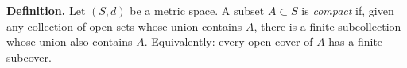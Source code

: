 \textbf{Definition.} Let $(S, d)$ be a metric space. A subset $A \subset S$ is \textit{compact} if, given any collection of open sets whose union contains $A$, there is a finite subcollection whose union also contains $A$. Equivalently: every open cover of $A$ has a finite subcover.
